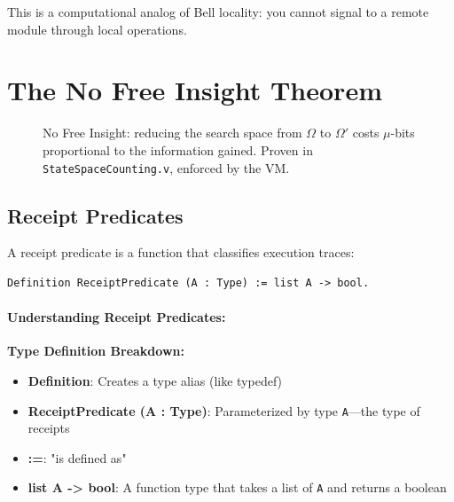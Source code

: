 This is a computational analog of Bell locality: you cannot signal to a remote module through local operations.

\section{The No Free Insight Theorem}

\begin{figure}[H]
\centering
{}
\caption{No Free Insight: reducing the search space from $\Omega$ to $\Omega'$ costs $\mu$-bits proportional to the information gained. Proven in \texttt{StateSpaceCounting.v}, enforced by the VM.}
\label{fig:no-free-insight}
\end{figure}


\subsection{Receipt Predicates}

A receipt predicate is a function that classifies execution traces:
\begin{lstlisting}
Definition ReceiptPredicate (A : Type) := list A -> bool.
\end{lstlisting}

\paragraph{Understanding Receipt Predicates:}
\textbf{Type Definition Breakdown:}
\begin{itemize}
    \item \textbf{Definition}: Creates a type alias (like typedef)
    \item \textbf{ReceiptPredicate (A : Type)}: Parameterized by type \texttt{A}—the type of receipts
    \item \textbf{:=}: "is defined as"
    \item \textbf{list A -> bool}: A function type that takes a list of \texttt{A} and returns a boolean
\end{itemize}

